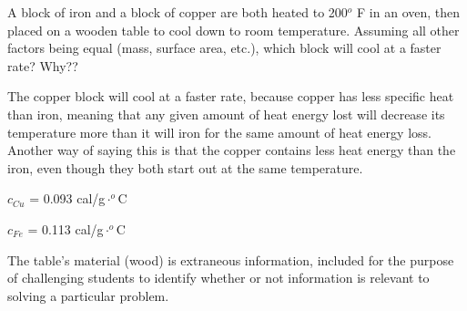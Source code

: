 

A block of iron and a block of copper are both heated to 200$^{o}$ F in an oven, then placed on a wooden table to cool down to room temperature.  Assuming all other factors being equal (mass, surface area, etc.), which block will cool at a faster rate?  Why??







The copper block will cool at a faster rate, because copper has less specific heat than iron, meaning that any given amount of heat energy lost will decrease its temperature more than it will iron for the same amount of heat energy loss.  Another way of saying this is that the copper contains less heat energy than the iron, even though they both start out at the same temperature.

\vskip 10pt

$c_{Cu}$ = 0.093 cal/g$\cdot ^{o}$C

\vskip 10pt

$c_{Fe}$ = 0.113 cal/g$\cdot ^{o}$C







The table's material (wood) is extraneous information, included for the purpose of challenging students to identify whether or not information is relevant to solving a particular problem.




